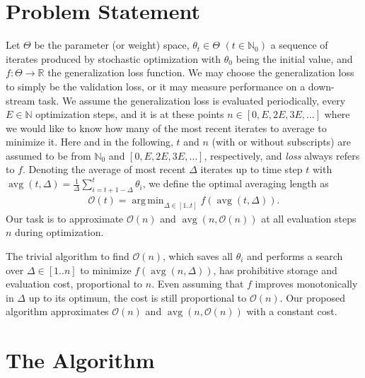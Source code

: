 \documentclass[twocolumn]{article}
\DeclareMathOperator*{\argmin}{arg\,min}
\DeclareMathOperator*{\avg}{avg}
\newcommand*{\natnum}{\mathbb{N}}
\newcommand*{\natnumzero}{\mathbb{N}_0}
\newcommand{\Rb}{\mathbb{R}}
\newcommand{\OL}{\mathcal{O}}
\begin{document}
\section{Problem Statement}
\label{sec:tta-problem-statement}

Let $\Theta$ be the parameter (or weight) space, $\theta_t \in \Theta$ $(t \in \natnumzero)$ a sequence of iterates produced by stochastic optimization with $\theta_0$ being the initial value, and $f \colon \Theta \to \Rb$ the generalization loss function.
We may choose the generalization loss to simply be the validation loss, or it may measure performance on a down-stream task.
We assume the generalization loss is evaluated periodically, every $E \in \natnum$ optimization steps, and it is at these points $n \in [0, E, 2E, 3E, \dots]$ where we would like to know how many of the most recent iterates to average to minimize it.
Here and in the following, $t$ and $n$ (with or without subscripts) are assumed to be from $\natnumzero$ and $[0, E, 2E, 3E, \dots]$, respectively, and \emph{loss} always refers to $f$.
Denoting the average of most recent $\Delta$ iterates up to time step $t$ with $\avg(t, \Delta) = \frac{1}{\Delta} \sum_{i=t+1-\Delta}^{t} \theta_i$, we define the optimal averaging length as
\begin{align*}
\OL(t) = \argmin_{\Delta \in [1..t]} f(\avg(t, \Delta)).
\end{align*}
Our task is to approximate $\OL(n)$ and $\avg(n, \OL(n))$ at all evaluation steps $n$ during optimization.

The trivial algorithm to find $\OL(n)$, which saves all $\theta_i$ and performs a search over $\Delta \in [1..n]$ to minimize $f(\avg(n, \Delta))$, has prohibitive storage and evaluation cost, proportional to $n$.
Even assuming that $f$ improves monotonically in $\Delta$ up to its optimum, the cost is still proportional to $\OL(n)$.
Our proposed algorithm approximates $\OL(n)$ and $\avg(n, \OL(n))$ with a constant cost.


\section{The Algorithm}
\label{sec:tta-algorithm}
\end{document}
